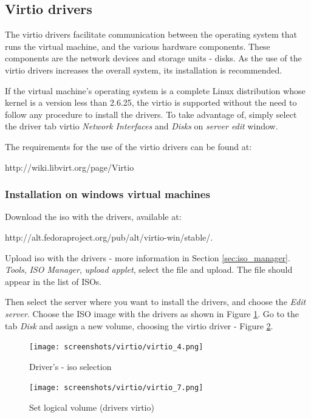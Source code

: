 \subsection{Virtio drivers}
The virtio drivers facilitate communication between the operating system that runs the virtual machine, and the various hardware components. These components are the network devices and storage units - disks. As the use of the virtio drivers increases the overall system, its installation is recommended.

If the virtual machine's operating system is a complete Linux distribution whose kernel is a version less than 2.6.25, the virtio is supported without the need to follow any procedure to install the drivers. To take advantage of, simply select the driver tab virtio \textit{Network Interfaces} and \textit{Disks} on \textit{server edit} window.

The requirements for the use of the virtio drivers can be found at:

http://wiki.libvirt.org/page/Virtio

\subsubsection*{Installation on windows virtual machines}

Download the iso with the drivers, available at:

http://alt.fedoraproject.org/pub/alt/virtio-win/stable/.

Upload iso with the drivers - more information in Section \ref{sec:iso_manager}. \textit{Tools}, \textit{ISO Manager}, \textit{upload applet}, select the file and upload. The file should appear in the list of ISOs.

Then select the server where you want to install the drivers, and choose the \textit{Edit server}. Choose the ISO image with the drivers as shown in Figure \ref{fig:virtio4}. Go to the tab \textit{Disk} and assign a new volume, choosing the virtio driver - Figure \ref{fig:virtio7}.

\begin{figure}[H]
	\begin{center}
	\texttt{[image: screenshots/virtio/virtio\_4.png]}
	\caption{Driver's - iso selection}
	\label{fig:virtio4}
	\end{center}
\end{figure}

\begin{figure}[H]
	\begin{center}
	\texttt{[image: screenshots/virtio/virtio\_7.png]}
	\caption{Set logical volume (drivers virtio)}
	\label{fig:virtio7}
	\end{center}
\end{figure}

